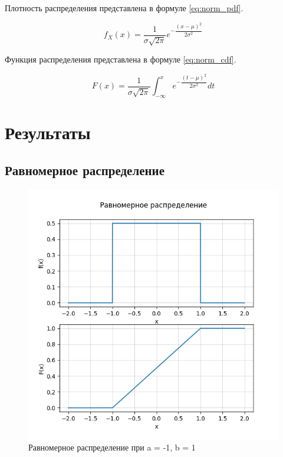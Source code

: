 Плотность распределения представлена в формуле \ref{eq:norm_pdf}.

\begin{equation}\label{eq:norm_pdf}
  f_X(x) = \dfrac{1}{\sigma \sqrt{2 \pi}} e^{-\dfrac{(x - \mu)^2}{2 \sigma^2}}
\end{equation}

Функция распределения представлена в формуле \ref{eq:norm_cdf}.

\begin{equation}\label{eq:norm_cdf}
  F (x) = \dfrac{1}{\sigma \sqrt{2\pi}} \int_{-\infty}^x e^{-\dfrac{(t- \mu)^2}{2 \sigma^2}} dt
\end{equation}
\pagebreak

\section{Результаты}
\subsection{Равномерное распределение}

\begin{figure}[h!]
  \centering
  \includegraphics[scale=0.65]{1/uniform1}
  \caption{Равномерное распределение при a = -1, b = 1}
\end{figure}

